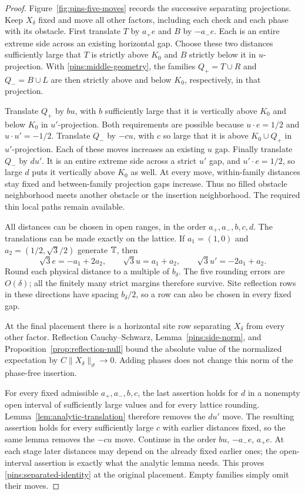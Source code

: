 \begin{proof}
Figure~\ref{fig:pins-five-moves} records the successive separating
projections.  Keep $X_\delta$ fixed and move all other factors, including
each check and each phase with its obstacle.  First translate $T$ by $a_+e$ and
$B$ by $-a_-e$.  Each is an entire extreme side across an existing
horizontal gap.  Choose these two distances sufficiently large that
$T$ is strictly above $K_0$ and $B$ strictly below it in
$u$-projection.  With \eqref{pins:middle-geometry}, the families
$Q_+=T\cup R$ and $Q_-=B\cup L$ are then strictly above and below
$K_0$, respectively, in that projection.

Translate $Q_+$ by $bu$, with $b$ sufficiently large that it is
vertically above $K_0$ and below $K_0$ in $u'$-projection.  Both
requirements are possible because
$u\cdot e=1/2$ and $u\cdot u'=-1/2$.  Translate $Q_-$ by $-cu$,
with $c$ so large that it is above $K_0\cup Q_+$ in
$u'$-projection.  Each of these moves increases an existing $u$ gap.
Finally translate $Q_-$ by $du'$.  It is an entire extreme side
across a strict $u'$ gap, and $u'\cdot e=1/2$, so large $d$ puts
it vertically above $K_0$ as well.  At every move, within-family
distances stay fixed and between-family projection gaps increase.
Thus no filled obstacle neighborhood meets another obstacle or the
insertion neighborhood.  The required thin local paths remain available.

All distances can be chosen in open ranges, in the order
$a_+,a_-,b,c,d$.  The translations can be made exactly on the lattice.
If $a_1=(1,0)$ and $a_2=(1/2,\sqrt3/2)$ generate $\mathbb T$, then
\[
 \sqrt3 e=-a_1+2a_2,\qquad
 \sqrt3 u=a_1+a_2,\qquad
 \sqrt3 u'=-2a_1+a_2.
\]
Round each physical distance to a multiple of $b_\delta$.  The five
rounding errors are $O(\delta)$; all the finitely many strict margins
therefore survive.  Site reflection rows in these directions have
spacing $b_\delta/2$, so a row can also be chosen in every fixed gap.

At the final placement there is a horizontal site row separating
$X_\delta$ from every other factor.  Reflection Cauchy--Schwarz,
Lemma~\ref{pins:side-norm}, and
Proposition~\ref{prop:reflection-null} bound the absolute value of
the normalized expectation by $C\|X_\delta\|_\vartheta\to0$.
Adding phases does not change this norm of the phase-free insertion.

For every fixed admissible $a_+,a_-,b,c$, the last assertion holds
for $d$ in a nonempty open interval of sufficiently large values and
for every lattice rounding.  Lemma~\ref{lem:analytic-translation}
therefore removes the $du'$ move.  The resulting assertion holds for
every sufficiently large $c$ with earlier distances fixed, so the same
lemma removes the $-cu$ move.  Continue in the order $bu$, $-a_-e$,
$a_+e$.  At each stage later distances may depend on the already fixed
earlier ones; the open-interval assertion is exactly what the analytic
lemma needs.  This proves \eqref{pins:separated-identity} at the original
placement.  Empty families simply omit their moves.
\end{proof}


